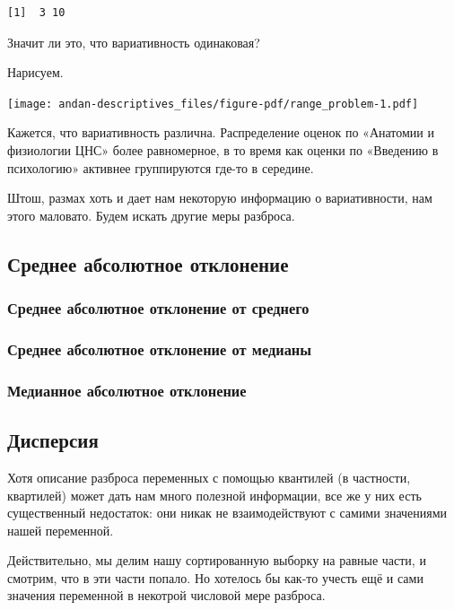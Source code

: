 \documentclass[
  letterpaper,
]{scrbook}
\theoremstyle{definition}
\theoremstyle{remark}
\begin{document}
\begin{verbatim}
[1]  3 10
\end{verbatim}

Значит ли это, что вариативность одинаковая?

Нарисуем.

\texttt{[image: andan-descriptives\_files/figure-pdf/range\_problem-1.pdf]}

Кажется, что вариативность различна. Распределение оценок по «Анатомии и
физиологии ЦНС» более равномерное, в то время как оценки по «Введению в
психологию» активнее группируются где-то в середине.

Штош, размах хоть и дает нам некоторую информацию о вариативности, нам
этого маловато. Будем искать другие меры разброса.

\subsection{Среднее абсолютное
отклонение}\label{andan-descriptives-average-absolute-deviation}

\subsubsection{Среднее абсолютное отклонение от
среднего}\label{andan-descriptives-mean-absolute-deviation-around-the-mean}

\subsubsection{Среднее абсолютное отклонение от
медианы}\label{andan-descriptives-mean-absolute-deviation-around-the-median}

\subsubsection{Медианное абсолютное
отклонение}\label{andan-descriptives-median-absolute-deviation}

\subsection{Дисперсия}\label{andan-descriptives-variance}

Хотя описание разброса переменных с помощью квантилей (в частности,
квартилей) может дать нам много полезной информации, все же у них есть
существенный недостаток: они никак не взаимодействуют с самими
значениями нашей переменной.

Действительно, мы делим нашу сортированную выборку на равные части, и
смотрим, что в эти части попало. Но хотелось бы как-то учесть ещё и сами
значения переменной в некотрой числовой мере разброса.
\end{document}
